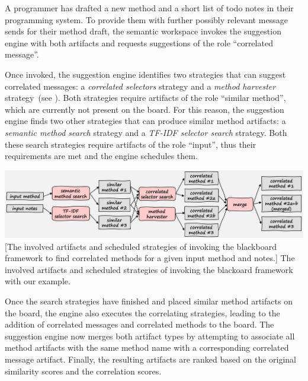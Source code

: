 \begin{example}
	A programmer has drafted a new method and a short list of todo notes in their programming system.
	To provide them with further possibly relevant message sends for their method draft, the semantic workspace invokes the suggestion engine with both artifacts and requests suggestions of the role ``correlated message''.

	Once invoked, the suggestion engine identifies two strategies that can suggest correlated messages: a \emph{correlated selectors} strategy and a \emph{method harvester} strategy~(see ).
	Both strategies require artifacts of the role ``similar method'', which are currently not present on the board.
	For this reason, the suggestion engine finds two other strategies that can produce similar method artifacts: a \emph{semantic method search} strategy and a \emph{TF-IDF selector search} strategy.
	Both these search strategies require artifacts of the role ``input'', thus their requirements are met and the engine schedules them.

	\vspace{\baselineskip}
	\begin{center}
		\includegraphics[width=\textwidth]{02_suggestions/example.png}
		[The involved artifacts and scheduled strategies of invoking the blackboard framework to find correlated methods for a given input method and notes.]{
			The involved artifacts and scheduled strategies of invoking the blackoard framework with our example.
		}
		\label{fig:design/suggestions/example}
	\end{center}

	Once the search strategies have finished and placed similar method artifacts on the board, the engine also executes the correlating strategies, leading to the addition of correlated messages and correlated methods to the board.
	The suggestion engine now merges both artifact types by attempting to associate all method artifacts with the same method name with a corresponding correlated message artifact.
	Finally, the resulting artifacts are ranked based on the original similarity scores and the correlation scores.
\end{example}

